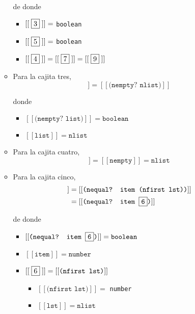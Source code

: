 \documentclass[letterpaper,11pt]{article}
\begin{document}
\begin{enumerate}
\begin{itemize}
        de donde 
        \begin{itemize}
            \item $[[\;\fbox{3}\;]] =$ \texttt{boolean}
            \item $[[\;\fbox{5}\;]] =$ \texttt{boolean}
            \item $[[\;\fbox{4}\;]] = [[\;\fbox{7}\;]] = [[\;\fbox{9}\;]]$
        \end{itemize}

        \item Para la cajita tres, 
        \begin{equation*}
            [[\;\fbox{3}\;]] = [[\texttt{(nempty? nlist)}]]
        \end{equation*}

        donde 
        \begin{itemize}
            \item $[[\texttt{(nempty? list)}]] = \texttt{boolean}$
            \item $[[\texttt{list}]] = \texttt{nlist}$
        \end{itemize}

        \item Para la cajita cuatro, 
        \begin{equation*}
            [[\;\fbox{4}\;]] = [[\texttt{nempty}]] = \texttt{nlist}
        \end{equation*}

        \item Para la cajita cinco,
        \begin{align*}
            [[\;\fbox{5}\;]]
            &= [[\texttt{(nequal? item (nfirst lst))}]] \\ 
            &= [[\texttt{(nequal? item \fbox{6})}]] 
        \end{align*}

        de donde 
        \begin{itemize}
            \item $[[\texttt{(nequal? item \fbox{6})}]] = \texttt{boolean}$
            \item $[[\texttt{item}]] = \texttt{number}$
            \item $[[\;\fbox{6}\;]] = [[\texttt{(nfirst lst)}]]$
            \begin{itemize}
                \item $[[\texttt{(nfirst lst)}]] =$ \texttt{number}
                \item $[[\texttt{lst}]] = \texttt{nlist}$
            \end{itemize}
        \end{itemize}


\end{itemize}
\end{enumerate}
\end{document}
